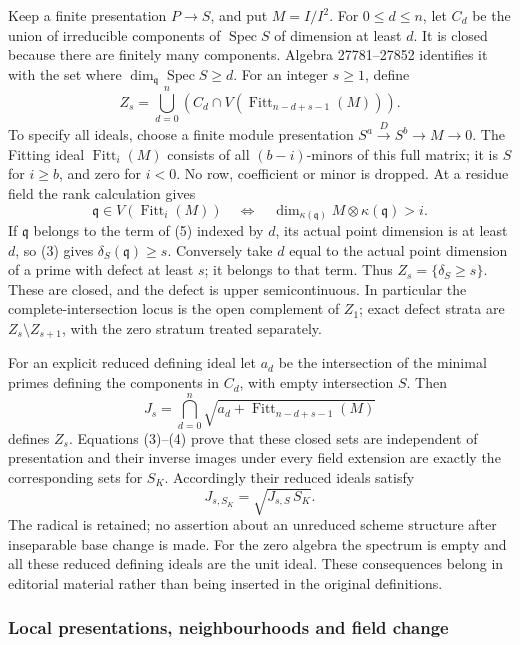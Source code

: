 Keep a finite presentation \(P\to S\), and put \(M=I/I^2\). For \(0\leq d\leq n\), let \(C_d\) be the union of irreducible components of \(\operatorname{Spec}S\) of dimension at least \(d\). It is closed because there are finitely many components. Algebra 27781--27852 identifies it with the set where \(\dim_{\mathfrak q}\operatorname{Spec}S\geq d\). For an integer \(s\geq1\), define \[
Z_s=\bigcup_{d=0}^{n}
\left(C_d\cap V(\operatorname{Fitt}_{n-d+s-1}(M))\right).\tag{5}
\] To specify all ideals, choose a finite module presentation \(S^a\xrightarrow D S^b\to M\to0\). The Fitting ideal \(\operatorname{Fitt}_i(M)\) consists of all \((b-i)\)-minors of this full matrix; it is \(S\) for \(i\geq b\), and zero for \(i<0\). No row, coefficient or minor is dropped. At a residue field the rank calculation gives \[
\mathfrak q\in V(\operatorname{Fitt}_i(M))
\quad\Longleftrightarrow\quad
\dim_{\kappa(\mathfrak q)}M\otimes\kappa(\mathfrak q)>i.
\] If \(\mathfrak q\) belongs to the term of (5) indexed by \(d\), its actual point dimension is at least \(d\), so (3) gives \(\delta_S(\mathfrak q)\geq s\). Conversely take \(d\) equal to the actual point dimension of a prime with defect at least \(s\); it belongs to that term. Thus \(Z_s=\{\delta_S\geq s\}\). These are closed, and the defect is upper semicontinuous. In particular the complete-intersection locus is the open complement of \(Z_1\); exact defect strata are \(Z_s\setminus Z_{s+1}\), with the zero stratum treated separately.

For an explicit reduced defining ideal let \(a_d\) be the intersection of the minimal primes defining the components in \(C_d\), with empty intersection \(S\). Then \[
J_s=\bigcap_{d=0}^{n}\sqrt{a_d+\operatorname{Fitt}_{n-d+s-1}(M)}
\] defines \(Z_s\). Equations (3)--(4) prove that these closed sets are independent of presentation and their inverse images under every field extension are exactly the corresponding sets for \(S_K\). Accordingly their reduced ideals satisfy \[
J_{s,S_K}=\sqrt{J_{s,S}\,S_K}.
\] The radical is retained; no assertion about an unreduced scheme structure after inseparable base change is made. For the zero algebra the spectrum is empty and all these reduced defining ideals are the unit ideal. These consequences belong in editorial material rather than being inserted in the original definitions.

\subsubsection{Local presentations, neighbourhoods and field change}\label{algebra-proof-045-local-presentations-neighbourhoods-and-field-change}

